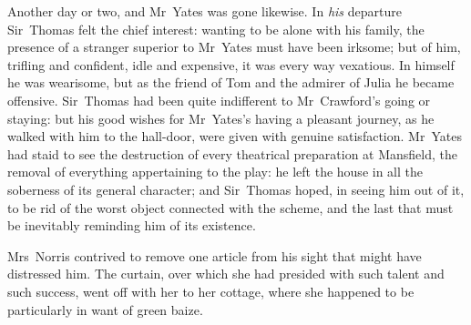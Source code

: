 Another day or two, and Mr~Yates was gone likewise. In \textit{his}  departure Sir~Thomas felt the chief interest: wanting to be alone with his family, the presence of a stranger superior to Mr~Yates must have been irksome; but of him, trifling and confident, idle and expensive, it was every way vexatious. In himself he was wearisome, but as the friend of Tom and the admirer of Julia he became offensive. Sir~Thomas had been quite indifferent to Mr~Crawford's going or staying: but his good wishes for Mr~Yates's having a pleasant journey, as he walked with him to the hall-door, were given with genuine satisfaction. Mr~Yates had staid to see the destruction of every theatrical preparation at Mansfield, the removal of everything appertaining to the play: he left the house in all the soberness of its general character; and Sir~Thomas hoped, in seeing him out of it, to be rid of the worst object connected with the scheme, and the last that must be inevitably reminding him of its existence.

Mrs~Norris contrived to remove one article from his sight that might have distressed him. The curtain, over which she had presided with such talent and such success, went off with her to her cottage, where she happened to be particularly in want of green baize. 